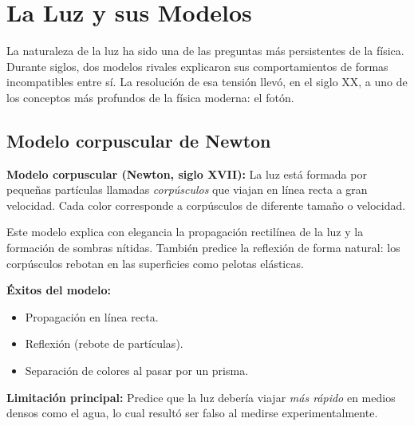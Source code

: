 \renewcommand{\tema}{Lección: Óptica}


\section{La Luz y sus Modelos}

\begin{seccion}
La naturaleza de la luz ha sido una de las preguntas más persistentes de la física. Durante siglos, dos modelos rivales explicaron sus comportamientos de formas incompatibles entre sí. La resolución de esa tensión llevó, en el siglo XX, a uno de los conceptos más profundos de la física moderna: el fotón.
\end{seccion}

\subsection{Modelo corpuscular de Newton}

\begin{seccion}
\begin{definicion}
\textbf{Modelo corpuscular (Newton, siglo XVII):} La luz está formada por pequeñas partículas llamadas \textit{corpúsculos} que viajan en línea recta a gran velocidad. Cada color corresponde a corpúsculos de diferente tamaño o velocidad.
\end{definicion}

Este modelo explica con elegancia la propagación rectilínea de la luz y la formación de sombras nítidas. También predice la reflexión de forma natural: los corpúsculos rebotan en las superficies como pelotas elásticas.

\textbf{Éxitos del modelo:}
\begin{itemize}
    \item Propagación en línea recta.
    \item Reflexión (rebote de partículas).
    \item Separación de colores al pasar por un prisma.
\end{itemize}

\textbf{Limitación principal:} Predice que la luz debería viajar \textit{más rápido} en medios densos como el agua, lo cual resultó ser falso al medirse experimentalmente.
\end{seccion}


